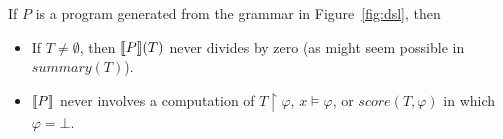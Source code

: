 \begin{proposition}
If $P$ is a program generated from the grammar in Figure~\ref{fig:dsl}, then
\begin{itemize}
    \item If $T \neq \emptyset$, then $\den{P}(T)$ never divides by zero
        (as might seem possible in $\mathit{summary}(T)$).
    \item $\den{P}$ never involves a computation of
        $T \upharpoonright \varphi$, $x \models \varphi$, or $\mathit{score}(T, \varphi)$
        in which $\varphi = \bot$.
\end{itemize}
\end{proposition}
